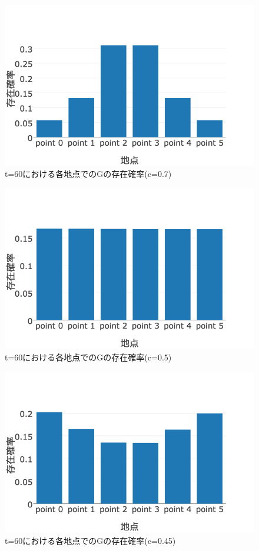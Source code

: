 \documentclass[11pt]{ltjsarticle}
\begin{document}
\begin{figure}
  \includegraphics[width=\textwidth]{fig4.png}
  \caption{ t=60における各地点でのGの存在確率(c=0.7)}
\end{figure}

\begin{figure}
  \includegraphics[width=\textwidth]{fig5.png}
  \caption{ t=60における各地点でのGの存在確率(c=0.5)}
\end{figure}

\begin{figure}
  \includegraphics[width=\textwidth]{fig6.png}
  \caption{ t=60における各地点でのGの存在確率(c=0.45)}
\end{figure}
\end{document}
